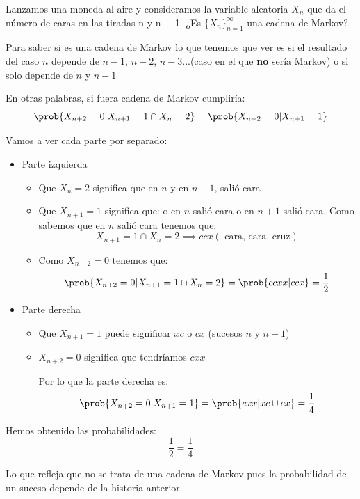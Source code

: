 \begin{problem}[3]
	Lanzamos una moneda al aire y consideramos la variable aleatoria $X_n$ que da el número
	de caras en las tiradas n y n − 1. ¿Es $\{X_n\}^{\infty}_{n=1}$ una cadena de Markov?
	\solution

	Para saber si es una cadena de Markov lo que tenemos que ver es si el resultado del caso $n$ depende de $n-1$, $n-2$, $n-3$...(caso en el que \textbf{no} sería Markov) o si solo depende de $n$ y $n-1$

	En otras palabras, si fuera cadena de Markov cumpliría:
	$$\prob{X_{n+2} = 0| X_{n+1} = 1 \cap X_n = 2} = \prob{X_{n+2} = 0 | X_{n+1} = 1}$$

	Vamos a ver cada parte por separado:
	\begin{itemize}
		\item Parte izquierda
		\begin{itemize}
			\item Que $X_n = 2$ significa que en $n$ y en $n-1$, salió cara
			\item Que $X_{n+1} = 1$ significa que: o en $n$ salió cara o en $n+1$ salió cara. Como sabemos que en $n$ salió cara tenemos que:
			$$ X_{n+1} = 1 \cap X_n = 2 \implies ccx(\text{ cara, cara, cruz})$$
			\item Como $X_{n+2} = 0$ tenemos que:
			$$\prob{X_{n+2} = 0| X_{n+1} = 1 \cap X_n = 2} = \prob{ccxx| ccx} = \frac{1}{2}$$
		\end{itemize}
		\item Parte derecha
		\begin{itemize}
			\item Que $X_{n+1} = 1$ puede significar $xc$ o $cx$ (sucesos $n$ y $n+1$)
			\item $X_{n+2} = 0$ significa que tendríamos $cxx$


			Por lo que la parte derecha es:
			$$\prob{X_{n+2} = 0 | X_{n+1} = 1} = \prob{cxx| xc \cup cx} = \frac{1}{4}$$
		\end{itemize}

	\end{itemize}

	Hemos obtenido las probabilidades:
	 $$ \frac{1}{2} = \frac{1}{4}$$

	Lo que refleja que no se trata de una cadena de Markov pues la probabilidad de un suceso depende de la historia anterior.

\end{problem}

